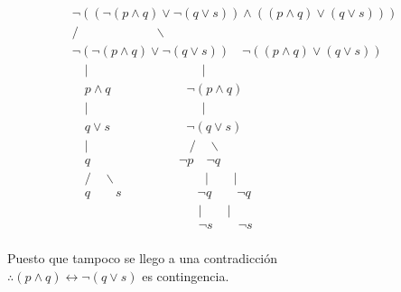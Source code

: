 \begin{center}
\[
\begin{array}{c}
\neg ((\neg(p \land q) \lor \neg (q \lor s))\land ((p \land q) \lor (q \lor s)))\\
/ \quad \quad \quad \quad \quad \quad \backslash \\
\neg (\neg(p \land q) \lor \neg (q \lor s)) \quad \neg ((p \land q) \lor (q \lor s)) \\
\quad | \quad \quad \quad \quad \quad \quad \quad \quad \quad |\\
\quad p \land q \quad \quad \quad \quad \quad \quad \neg (p\land q) \\
\quad | \quad \quad \quad \quad \quad \quad \quad \quad \quad |\\
\quad q \lor s \quad \quad \quad \quad \quad \quad \neg (q \lor s) \\
\quad | \quad \quad \quad \quad \quad \quad  \quad \quad / \quad \backslash \\
\quad q \quad \quad \quad  \quad \quad  \quad \quad \neg p \quad \neg q \\
\quad /  \quad \backslash \quad \quad \quad \quad \quad  \quad \quad  | \quad \quad | \quad  \\
\quad q  \quad \quad s \quad \quad \quad \quad   \quad \quad  \neg q \quad \quad \neg q \quad  \\
\quad   \quad \quad  \quad \quad \quad \quad \quad   \quad \quad  | \quad \quad | \quad  \\
\quad   \quad \quad  \quad \quad \quad \quad \quad   \quad \quad  \neg s\quad \quad \neg s \quad  \\
\end{array}
\]
\end{center}
Puesto que tampoco se llego a una contradicción \\
$\therefore (p \land q) \leftrightarrow \neg(q \lor s)$ es contingencia.\\



